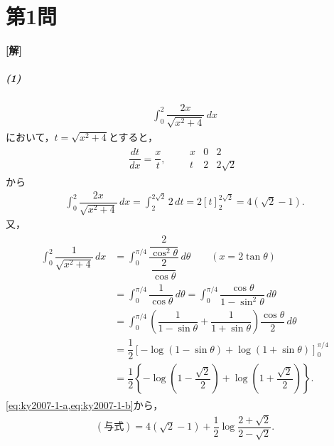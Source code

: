 \documentclass[../main.tex]{subfiles}
\begin{document}
\section*{第1問}

{\bf [解]}
\subparagraph{(1)}
\begin{align}
  \int_0^2\dfrac{2x}{\sqrt{x^2+4}}\,dx
\end{align}
において，$t=\sqrt{x^2+4}$とすると，
\begin{align}
  \dfrac{dt}{dx}=\dfrac{x}{t},\qquad
  \begin{array}{c|cc}x&0&2\\\hline t&2&2\sqrt{2}
  \end{array}
\end{align}
から
\begin{align}
  \int_0^2\dfrac{2x}{\sqrt{x^2+4}}\,dx
  =\int_2^{2\sqrt{2}}2\,dt
  =2[t]_2^{2\sqrt{2}}=4(\sqrt{2}-1).\label{eq:ky2007-1-a}
\end{align}
又，
\begin{align}
  \begin{split}
    \int_0^2\dfrac{1}{\sqrt{x^2+4}}\,dx
    &=\int_0^{\pi/4}\dfrac{\dfrac{2}{\cos^2\theta}}{\dfrac{2}{\cos\theta}}\,d\theta
    \qquad(x=2\tan\theta)\\
    &=\int_0^{\pi/4}\dfrac{1}{\cos\theta}\,d\theta
    =\int_0^{\pi/4}\dfrac{\cos\theta}{1-\sin^2\theta}\,d\theta\\
    &=\int_0^{\pi/4}\left(\dfrac{1}{1-\sin\theta}+\dfrac{1}{1+\sin\theta}\right)
    \dfrac{\cos\theta}{2}\,d\theta\\
    &=\dfrac{1}{2}\left[-\log(1-\sin\theta)+\log(1+\sin\theta)\right]_0^{\pi/4}\\
    &=\dfrac{1}{2}\left\{-\log\left(1-\dfrac{\sqrt{2}}{2}\right)
    +\log\left(1+\dfrac{\sqrt{2}}{2}\right)\right\}.
  \end{split}\label{eq:ky2007-1-b}
\end{align}
\cref{eq:ky2007-1-a,eq:ky2007-1-b}から，
\begin{align}
  (\text{与式})=4(\sqrt{2}-1)+\dfrac{1}{2}\log\dfrac{2+\sqrt{2}}{2-\sqrt{2}}.
\end{align}
\end{document}
